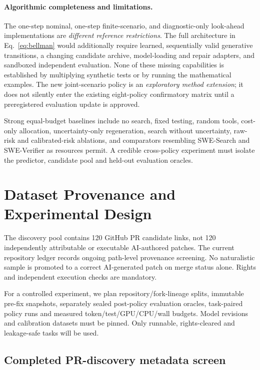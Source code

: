 \documentclass[pdflatex,sn-basic]{sn-jnl}
\begin{document}
\paragraph{Algorithmic completeness and limitations.}
The one-step nominal, one-step finite-scenario,
and diagnostic-only look-ahead implementations
are \emph{different reference restrictions}.
The full architecture in Eq.~\eqref{eq:bellman}
would additionally require learned,
sequentially valid generative transitions,
a changing candidate archive, model-loading
and repair adapters, and sandboxed independent
evaluation. None of these missing capabilities
is established by multiplying synthetic tests
or by running the mathematical examples.
The new joint-scenario policy is an
\emph{exploratory method extension}; it does
not silently enter the existing eight-policy
confirmatory matrix until a preregistered
evaluation update is approved.

Strong equal-budget baselines include no search, fixed testing, random
tools, cost-only allocation, uncertainty-only regeneration,
search without uncertainty, raw-risk and calibrated-risk ablations,
and comparators resembling SWE-Search and SWE-Verifier as resources permit.
A credible cross-policy experiment must isolate the predictor,
candidate pool and held-out evaluation oracles.

\section{Dataset Provenance and Experimental Design}\label{sec:dataset}
The discovery pool contains 120 GitHub PR candidate links, not 120
independently attributable or executable AI-authored patches.
The current repository ledger records ongoing path-level provenance
screening. No naturalistic sample is promoted to a correct
AI-generated patch on merge status alone. Rights and independent
execution checks are mandatory.

For a controlled experiment, we plan repository/fork-lineage splits,
immutable pre-fix snapshots, separately sealed post-policy evaluation
oracles, task-paired policy runs and measured token/test/GPU/CPU/wall
budgets. Model revisions and calibration datasets must be pinned.
Only runnable, rights-cleared and leakage-safe tasks will be used.

\subsection{Completed PR-discovery metadata screen}\label{sec:prscreen}
\end{document}
